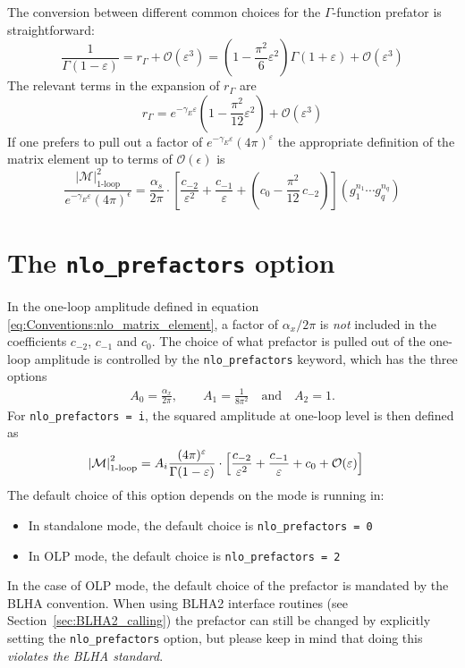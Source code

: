 The conversion between different common choices for the $\Gamma$-function prefator is straightforward:
\begin{equation}
\frac{1}{\Gamma(1-\varepsilon)}=r_\Gamma+{\mathcal O}(\varepsilon^3)=
\left(1-\frac{\pi^2}{6}\varepsilon^2\right)\Gamma(1+\varepsilon)
   +{\mathcal O}(\varepsilon^3)
\end{equation}
The relevant terms in the expansion of $r_\Gamma$ are
\begin{equation}
r_\Gamma=e^{-\gamma_E\varepsilon}
\left(1-\frac{\pi^2}{12}\varepsilon^2\right)+\mathcal{O}(\varepsilon^3)
\end{equation}
If one prefers to pull out a factor of $e^{-\gamma_E\varepsilon}(4\pi)^{\varepsilon}$ the appropriate definition of the matrix element up to terms of $\mathcal{O}(\epsilon)$ is
\begin{equation}
\frac{\left\vert\mathcal{M}\right\vert^2_{\text{1-loop}}}%
{e^{-\gamma_E\varepsilon}(4\pi)^\epsilon}=
\frac{\alpha_s}{2\pi}
\cdot\left[\frac{c_{-2}}{\varepsilon^2}+\frac{c_{-1}}{\varepsilon}
+\left(c_0-\frac{\pi^2}{12}\,c_{-2}\right)
\right](g_1^{n_1}\cdots g_q^{n_q})
\end{equation}


\section{The \texttt{nlo\_prefactors} option}
\label{sec:nlo_prefactors}
In the one-loop amplitude defined in equation \eqref{eq:Conventions:nlo_matrix_element}, a factor of $\alpha_x/2\pi$ is \emph{not} included in the coefficients $c_{-2}$, $c_{-1}$ and $c_0$. The choice of what prefactor is pulled out of the one-loop amplitude is controlled by the \texttt{nlo\_prefactors} keyword, which has the three options
\begin{eqnarray}
   A_0 = \frac{\alpha_x}{2\pi}, \qquad A_1 = \frac{1}{8 \pi^2} \quad \text{and} \quad A_2 = 1.
\end{eqnarray}
For \texttt{nlo\_prefactors = i}, the squared amplitude at one-loop level is then defined as
\begin{align}
  \left\vert\mathcal{M}\right\vert^2_{\text{1-loop}}
    &= A_i\frac{(4\pi)^\varepsilon}{\Gamma(1-\varepsilon)}\cdot\left[
      \frac{c_{-2}}{\varepsilon^2}+\frac{c_{-1}}{\varepsilon}+c_0+{\mathcal{O}}(\varepsilon)\right]
\end{align}
The default choice of this option depends on the mode \gosam is running in:
\begin{itemize}
   \item In standalone mode, the default choice is \texttt{nlo\_prefactors = 0}
   \item In OLP mode, the default choice is \texttt{nlo\_prefactors = 2}
\end{itemize}
In the case of OLP mode, the default choice of the prefactor is mandated by the BLHA convention. When using BLHA2 interface routines (see Section~\ref{sec:BLHA2_calling}) the prefactor can still be changed by explicitly setting the \texttt{nlo\_prefactors} option, but please keep in mind that doing this \emph{violates the BLHA standard}.

